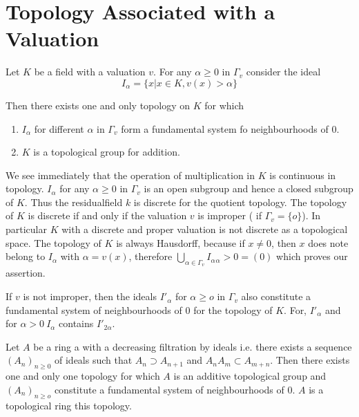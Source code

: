 \section{Topology Associated with a Valuation}\label{part1:chap1:sec3}

Let $K$ be a field with a valuation $v$. For any $\alpha \geq 0$ in
$\Gamma_v$ consider the ideal 
$$
I_\alpha = \{ x | x \in K, v(x) > \alpha\}
$$

Then there exists one and only topology on $K$ for which 
\begin{enumerate}[(1)]
\item $I_\alpha$ for different $\alpha$ in $\Gamma_v$ form
  a fundamental system fo neighbourhoods of $0$.  
\item $K$ is a topological group for addition. 
\end{enumerate}

We see immediately that the operation of multiplication in $K$ is
continuous in topology. $I_\alpha$ for any $\alpha \geq 0$ in $\Gamma
_v$ is an open subgroup and hence a closed subgroup of $K$. Thus the  
residual\pageoriginale field $k$ is discrete for the quotient
topology. The topology 
of $K$ is discrete if and only if the valuation $v$ is improper ( if
$\Gamma_{v} = \{o\}$). In particular $K$ with a discrete and proper
valuation is not discrete as a topological space. The topology of $K$
is always Hausdorff, because if $x \neq 0$, then $x$ does note belong
to $I_{\alpha}$ with $\alpha = v(x)$, therefore
$\bigcup\limits_{\alpha \in \Gamma_v} I_\alpha {}_\alpha
  > 0 = (0)$ which proves our assertion.  

\begin{remark}\label{part1:chap1:sec3:rem1}%
  If $v$ is not improper, then the ideals $I'_{\alpha}$ for $\alpha
  \ge o$ in $\Gamma_{v}$ also constitute a fundamental system of
  neighbourhoods of $0$ for the topology of $K$. For, $I'_{\alpha}$
  and for $\alpha > 0~ I_{\alpha}$ contains $I'_{2 \alpha}$. 
\end{remark}

\begin{remark}\label{part1:chap1:sec3:rem2} %
  Let $A$ be a ring a with a decreasing filtration by ideals
  i.e. there exists a sequence $(A_{n})_{n \geq 0}$ of ideals such
  that $A_{n} \supset A_{n + 1}$ and $A_{n} A_{m} \subset
  A_{m+n}$. Then there exists one and only one topology for which $A$
  is an additive topological group and $(A_{n})_{n \ge o}$ constitute
  a fundamental system of neighbourhoods of $0$. $A$ is a topological
  ring this topology. 
\end{remark}

